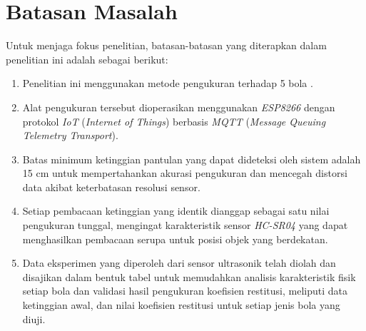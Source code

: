\section{Batasan Masalah}
 Untuk menjaga fokus penelitian, batasan-batasan yang diterapkan dalam penelitian ini adalah sebagai berikut:
\begin{enumerate}
    \item Penelitian ini menggunakan metode pengukuran terhadap 5 bola .
    \item Alat pengukuran tersebut dioperasikan menggunakan \textit{ESP8266} dengan protokol  \textit{IoT} (\textit{Internet of Things}) berbasis \textit{MQTT} (\textit{Message Queuing Telemetry Transport}).
    \item Batas minimum ketinggian pantulan yang dapat dideteksi oleh sistem adalah 15 cm untuk mempertahankan akurasi pengukuran dan mencegah distorsi data akibat keterbatasan resolusi sensor.
    \item Setiap pembacaan ketinggian yang identik dianggap sebagai satu nilai pengukuran tunggal, mengingat karakteristik sensor \textit{HC-SR04} yang dapat menghasilkan pembacaan serupa untuk posisi objek yang berdekatan.
    \item Data eksperimen yang diperoleh dari sensor ultrasonik telah diolah dan disajikan dalam bentuk tabel untuk memudahkan analisis karakteristik fisik setiap bola dan validasi hasil pengukuran koefisien restitusi, meliputi data ketinggian awal, dan nilai koefisien restitusi untuk setiap jenis bola yang diuji.
\end{enumerate}

